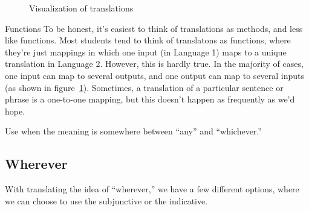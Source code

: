 \begin{figure}
 \centering

\caption{Visualization of translations}
\label{fig:function}
\end{figure}

\begin{conf}{Functions}
	To be honest, it's easiest to think of translations as methods, and less like functions. Most students tend to think of translatons as functions, where they're just mappings in which one input (in Language 1) maps to a unique translation in Language 2. However, this is hardly true. In the majority of cases, one input can map to several outputs, and one output can map to several inputs (as shown in figure~\ref{fig:function}). Sometimes, a translation of a particular sentence or phrase is a one-to-one mapping, but this doesn't happen as frequently as we'd hope.
\end{conf}

Use  when the meaning is somewhere between ``any'' and ``whichever.''
\subsection{Wherever}

With translating the idea of ``wherever,'' we have a few different options, where we can choose to use the subjunctive or the indicative. 

